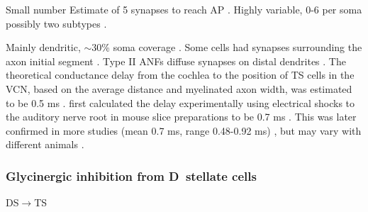 Small number \citep{Cant:1981,FayPopper:1994,ReddCahillEtAl:2002,RyugoWrigthEtAl:1993,Ryugo:1992,RyugoParks:2003}
Estimate of 5 synapses to reach AP \citep[Mouse][]{FerragamoGoldingEtAl:1998a}. 
Highly variable, 0-6 per soma possibly two subtypes \citep[Chinchilla][]{JosephsonMorest:1998}.

Mainly dendritic, $\sim$30\% soma coverage \citep[Cat][]{Cant:1981,Cant:1982,RyugoWrightEtAl:1993,TolbertMorest:1982a}. 
\citep[cat][Soma: 36$\pm$10.5 \%  of 21 (range 6-38) \% area coverage, Prox: 43$\pm$29 \%  of 46 \% area cov., Distal: 40$\pm$12 \%  of 22 \% area cov.]{SmithRhode:1989}
Some cells had synapses surrounding the axon initial segment \citep{JosephsonMorest:1998}. 
Type II ANFs diffuse synapses on distal dendrites \citep{BensonBrown:2004}.
The theoretical conductance delay from the cochlea to the position of TS cells in the VCN, based on the average distance and myelinated axon width, was estimated to be 0.5 ms  \citep{Brown:1993,BrownLedwith:1990}. 
\citet{Oertel:1983} first calculated the delay experimentally using electrical shocks to the auditory nerve root in mouse slice preparations to be 0.7 ms \citep{Oertel:1983}. 
This was later confirmed in more studies (mean 0.7 ms, range 0.48-0.92 ms) \citep[Mice][]{FerragamoGoldingEtAl:1998a}, but may vary with different animals  \citep[0.5 ms in chinchilla][]{WickesbergOertel:1993}. 


\subsubsection{Glycinergic inhibition from D~stellate cells}

DS\ensuremath{\rightarrow}TS                        


